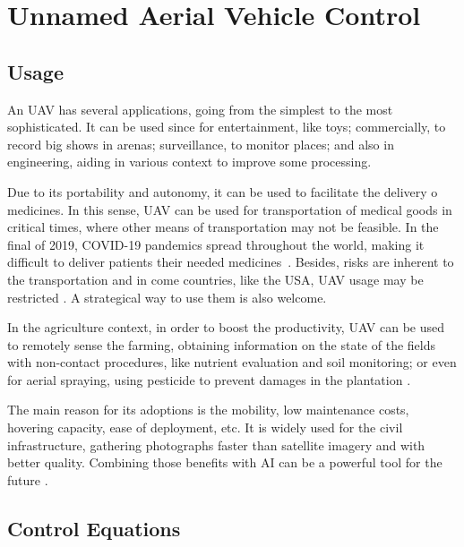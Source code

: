 \section{Unnamed Aerial Vehicle Control}

\subsection{Usage}

An UAV has several applications, going from the simplest to the most sophisticated. It can be used since for entertainment, like toys; commercially, to record big shows in arenas; surveillance, to monitor places; and also in engineering, aiding in various context to improve some processing.

Due to its portability and autonomy, it can be used to facilitate the delivery o medicines. In this sense, UAV can be used for transportation of medical goods in critical times, where other means of transportation may not be feasible.
In the final of 2019, COVID-19 pandemics spread throughout the world, making it difficult to deliver patients their needed medicines~\cite{ramakrishnan2023,mcphillips2022}.
Besides, risks are inherent to the transportation and in come countries, like the USA, UAV usage may be restricted \cite{thiels2015}. 
A strategical way to use them is also welcome.

In the agriculture context, in order to boost the productivity, UAV can be used to remotely sense the farming, obtaining information on the state of the fields with non-contact procedures, like nutrient evaluation and soil monitoring; or even for aerial spraying, using pesticide to prevent damages in the plantation \cite{delcerro2021}.

The main reason for its adoptions is the mobility, low maintenance costs, hovering capacity, ease of deployment, etc. 
It is widely used for the civil infrastructure, gathering photographs faster than  satellite imagery and with better quality. 
Combining those benefits with AI can be a powerful tool for the future \cite{sivakumar2021}. 


\subsection{Control Equations}

